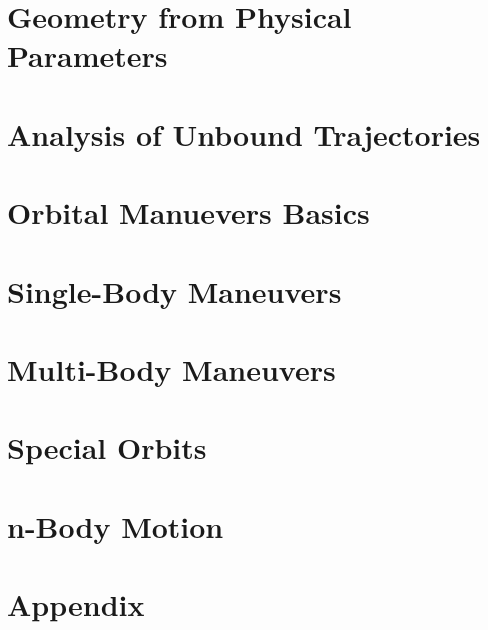 \documentclass{article}
\begin{document}
\pagebreak
\section{Geometry from Physical Parameters}\label{sec:Geometry from Physical Parameters}


\pagebreak
\section{Analysis of Unbound Trajectories}\label{sec:Special Trajectories}


\pagebreak
\section{Orbital Manuevers Basics}\label{sec:Manuevers Basics}


\pagebreak
\section{Single-Body Maneuvers}\label{sec:Manuevers}


\pagebreak
\section{Multi-Body Maneuvers}\label{sec:Multibody Maneuevers}


\pagebreak
\section{Special Orbits}\label{sec:Special Orbits}


\pagebreak
\section{n-Body Motion}\label{sec:N Body Motion}


\pagebreak
\section{Appendix}\label{sec:Appendix}


\end{document}
